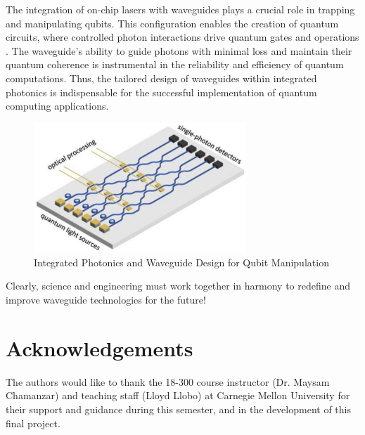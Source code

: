 \documentclass[10pt]{article}
\begin{document}
The integration of on-chip lasers with waveguides plays a crucial role in trapping and manipulating qubits. 
This configuration enables the creation of quantum circuits, where controlled photon interactions drive quantum gates and operations \cite{ref01}. The waveguide's ability to guide photons with minimal loss and maintain their quantum coherence is instrumental in the reliability and efficiency of quantum computations.
Thus, the tailored design of waveguides within integrated photonics is indispensable for the successful implementation of quantum computing applications.

\begin{figure}[h]
    \centering
    \includegraphics[width = 8cm]{qc.png}
    \caption{Integrated Photonics and Waveguide Design for Qubit Manipulation} 
    \end{figure}



Clearly, science and engineering must work together in harmony to redefine and improve waveguide technologies for the future!







\section{Acknowledgements}


The authors would like to thank the 18-300 course instructor (Dr. Maysam Chamanzar)
and teaching staff (Lloyd Llobo) at Carnegie Mellon University for their support and
guidance during this semester, and in the development of this final project.



\end{document}
